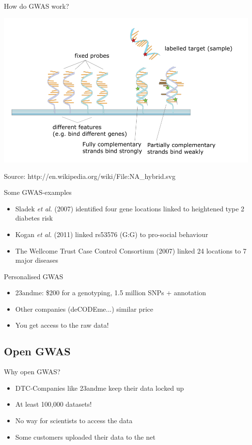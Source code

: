 \documentclass[12pt,a4paper]{beamer}
\begin{document}
\begin{frame}{How do GWAS work?}
\begin{center}
\includegraphics[scale=0.3]{microarray.png} \\
\begin{tiny}
Source: http://en.wikipedia.org/wiki/File:NA\_hybrid.svg
\end{tiny}
\end{center}
\end{frame}


\begin{frame}{Some GWAS-examples}
\begin{itemize}
\item Sladek \textit{et al.} (2007) identified four gene locations linked to heightened type 2 diabetes risk
\pause \item Kogan \textit{et al.} (2011) linked rs53576 (G:G) to pro-social behaviour
\pause \item The Wellcome Trust Case Control Consortium (2007) linked 24 locations to 7 major diseases 
\end{itemize}
\end{frame}

\begin{frame}{Personalised GWAS}
\begin{itemize}
\item 23andme: \$200 for a genotyping, 1.5 million SNPs + annotation
\pause \item Other companies (deCODEme...) similar price
\pause \item You get access to the raw data!
\end{itemize}
\end{frame}

\subsection{Open GWAS}
\begin{frame}{Why open GWAS?}
\begin{itemize}
\item DTC-Companies like 23andme keep their data locked up
\pause \item At least 100,000 datasets!
\pause \item No way for scientists to access the data
\pause \item Some customers uploaded their data to the net
\end{itemize}
\end{frame}
\end{document}
